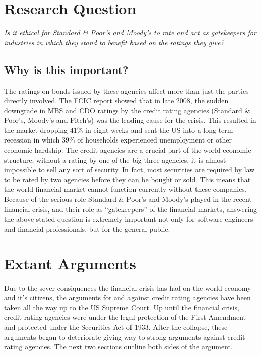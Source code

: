 \documentclass[11pt]{article}
\begin{document}
\begin{multicols}{2}

\section{Research Question}

\textit{Is it ethical for Standard \& Poor's and Moody's to rate and act as gatekeepers for industries in which they stand to benefit based on the ratings they give?}
\newline

\subsection{Why is this important?}

The ratings on bonds issued by these agencies affect more than just the parties directly involved. The FCIC report showed that in late 2008, the sudden downgrade in MBS and CDO ratings by the credit rating agencies (Standard \& Poor's, Moody's and Fitch's) was the leading cause for the crisis. \cite{huffCreditCause, govtReport}  This resulted in the market dropping 41\% in eight weeks \cite{marketWatch} and sent the US into a long-term recession in which 39\% of households experienced unemployment or other economic hardship. \cite{collapseImpact}  The credit agencies are a crucial part of the world economic structure; without a rating by one of the big three agencies, it is almost impossible to sell any sort of security.  In fact, most securities are required by law to be rated by two agencies before they can be bought or sold. \cite{wpMoodies}  This means that the world financial market cannot function currently without these companies.  Because of the serious role Standard \& Poor's and Moody's played in the recent financial crisis, and their role as ``gatekeepers'' of the financial markets, answering the above stated question is extremely important not only for software engineers and financial professionals, but for the general public.    


\section{Extant Arguments}

Due to the sever consiquences the financial crisis has had on the world economy and it's citizens, the arguments for and against credit rating agencies have been taken all the way up to the US Supreme Court.  Up until the financial crisis, credit rating agencies were under the legal protection of the First Amendment and protected under the Securities Act of 1933.  After the collapse, these arguments began to deteriorate giving way to strong arguments against credit rating agencies.  The next two sections outline both sides of the argument.


\end{multicols}
\end{document}
